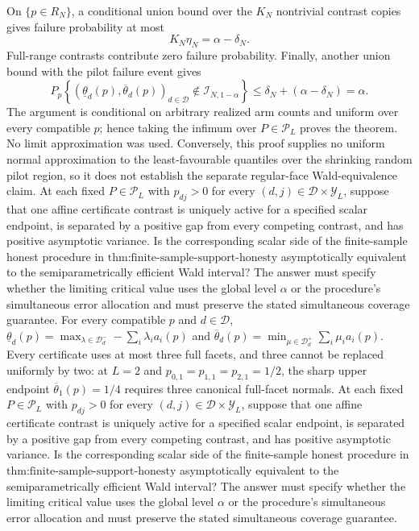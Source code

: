 On \(\{p\in R_N\}\), a conditional union bound over the \(K_N\) nontrivial contrast copies gives failure probability at most
\[
 K_N\eta_N=\alpha-\delta_N.
\]
Full-range contrasts contribute zero failure probability.  Finally, another union bound with the pilot failure event gives
\[
 P_p\left\{(\underline\theta_d(p),\overline\theta_d(p))_{d\in\mathcal D}
 \notin\mathcal I_{N,1-\alpha}\right\}
 \le\delta_N+(\alpha-\delta_N)=\alpha.
\]
The argument is conditional on arbitrary realized arm counts and uniform over every compatible \(p\); hence taking the infimum over \(P\in\mathcal P_L\) proves the theorem.  No limit approximation was used.  Conversely, this proof supplies no uniform normal approximation to the least-favourable quantiles over the shrinking random pilot region, so it does not establish the separate regular-face Wald-equivalence claim.
At each fixed \(P\in\mathcal P_L\) with \(p_{dj}>0\) for every \((d,j)\in\mathcal D\times\mathcal Y_L\), suppose that one affine certificate contrast is uniquely active for a specified scalar endpoint, is separated by a positive gap from every competing contrast, and has positive asymptotic variance.  Is the corresponding scalar side of the finite-sample honest procedure in \(\text{thm:finite-sample-support-honesty}\) asymptotically equivalent to the semiparametrically efficient Wald interval?  The answer must specify whether the limiting critical value uses the global level \(\alpha\) or the procedure's simultaneous error allocation and must preserve the stated simultaneous coverage guarantee.
For every compatible \(p\) and \(d\in\mathcal D\), \(\underline\theta_d(p)=\max_{\lambda\in\mathcal D_d^-}-\sum_i\lambda_i a_i(p)\) and \(\overline\theta_d(p)=\min_{\mu\in\mathcal D_d^+}\sum_i\mu_i a_i(p)\). Every certificate uses at most three full facets, and three cannot be replaced uniformly by two: at \(L=2\) and \(p_{0,1}=p_{1,1}=p_{2,1}=1/2\), the sharp upper endpoint \(\overline\theta_1(p)=1/4\) requires three canonical full-facet normals.
At each fixed \(P\in\mathcal P_L\) with \(p_{dj}>0\) for every \((d,j)\in\mathcal D\times\mathcal Y_L\), suppose that one affine certificate contrast is uniquely active for a specified scalar endpoint, is separated by a positive gap from every competing contrast, and has positive asymptotic variance.  Is the corresponding scalar side of the finite-sample honest procedure in \(\text{thm:finite-sample-support-honesty}\) asymptotically equivalent to the semiparametrically efficient Wald interval?  The answer must specify whether the limiting critical value uses the global level \(\alpha\) or the procedure's simultaneous error allocation and must preserve the stated simultaneous coverage guarantee.
